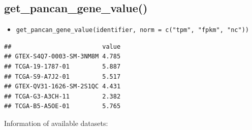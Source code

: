 \documentclass[
]{book}
\newenvironment{Shaded}{\begin{snugshade}}{\end{snugshade}}
\newcommand{\AttributeTok}[1]{\textcolor[rgb]{0.13,0.29,0.53}{#1}}
\newcommand{\FunctionTok}[1]{\textcolor[rgb]{0.13,0.29,0.53}{\textbf{#1}}}
\newcommand{\NormalTok}[1]{#1}
\newcommand{\OtherTok}[1]{\textcolor[rgb]{0.56,0.35,0.01}{#1}}
\newcommand{\SpecialCharTok}[1]{\textcolor[rgb]{0.81,0.36,0.00}{\textbf{#1}}}
\newcommand{\StringTok}[1]{\textcolor[rgb]{0.31,0.60,0.02}{#1}}
\providecommand{\tightlist}{%
  \setlength{\itemsep}{0pt}\setlength{\parskip}{0pt}}
\begin{document}
\subsection{get\_pancan\_gene\_value()}\label{get_pancan_gene_value}

\begin{itemize}
\tightlist
\item
  \texttt{get\_pancan\_gene\_value(identifier,\ norm\ =\ c("tpm",\ "fpkm",\ "nc"))}
\end{itemize}

\begin{Shaded}
\end{Shaded}

\begin{verbatim}
##                         value
## GTEX-S4Q7-0003-SM-3NM8M 4.785
## TCGA-19-1787-01         5.887
## TCGA-S9-A7J2-01         5.517
## GTEX-QV31-1626-SM-2S1QC 4.431
## TCGA-G3-A3CH-11         2.382
## TCGA-B5-A5OE-01         5.765
\end{verbatim}

Information of available datasets:
\end{document}
